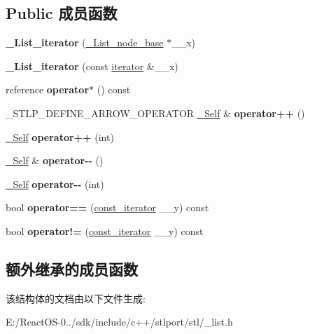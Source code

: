 \subsection*{Public 成员函数}
\begin{DoxyCompactItemize}
\item 
\mbox{\label{struct___list__iterator_af55729763691bebee5eb588d18cbed0b}} 
{\bfseries \+\_\+\+List\+\_\+iterator} (\hyperlink{struct___list__node__base}{\+\_\+\+List\+\_\+node\+\_\+base} $\ast$\+\_\+\+\_\+x)
\item 
\mbox{\label{struct___list__iterator_ab6acb69220ef88d8b08afce813d27341}} 
{\bfseries \+\_\+\+List\+\_\+iterator} (const \hyperlink{struct___list__iterator}{iterator} \&\+\_\+\+\_\+x)
\item 
\mbox{\label{struct___list__iterator_a5df300e0ea9dc281703eaabe8ec1741e}} 
reference {\bfseries operator$\ast$} () const
\item 
\mbox{\label{struct___list__iterator_a9cfd9449410548623388a8b28020253f}} 
\+\_\+\+S\+T\+L\+P\+\_\+\+D\+E\+F\+I\+N\+E\+\_\+\+A\+R\+R\+O\+W\+\_\+\+O\+P\+E\+R\+A\+T\+OR \hyperlink{struct___list__iterator}{\+\_\+\+Self} \& {\bfseries operator++} ()
\item 
\mbox{\label{struct___list__iterator_a51574ccca9f905ec314105fde336ded5}} 
\hyperlink{struct___list__iterator}{\+\_\+\+Self} {\bfseries operator++} (int)
\item 
\mbox{\label{struct___list__iterator_a89a0eac7d6d0ea505125f04705df9457}} 
\hyperlink{struct___list__iterator}{\+\_\+\+Self} \& {\bfseries operator-\/-\/} ()
\item 
\mbox{\label{struct___list__iterator_ac148cd86671003ff1165803328c3e972}} 
\hyperlink{struct___list__iterator}{\+\_\+\+Self} {\bfseries operator-\/-\/} (int)
\item 
\mbox{\label{struct___list__iterator_aa53e8ed668eb74d6dab92b59b8e226fd}} 
bool {\bfseries operator==} (\hyperlink{struct___list__iterator}{const\+\_\+iterator} \+\_\+\+\_\+y) const
\item 
\mbox{\label{struct___list__iterator_a35177a1a135d50d5d9ca8ed231d91a01}} 
bool {\bfseries operator!=} (\hyperlink{struct___list__iterator}{const\+\_\+iterator} \+\_\+\+\_\+y) const
\end{DoxyCompactItemize}
\subsection*{额外继承的成员函数}


该结构体的文档由以下文件生成\+:\begin{DoxyCompactItemize}
\item 
E\+:/\+React\+O\+S-\/0../sdk/include/c++/stlport/stl/\+\_\+list.\+h\end{DoxyCompactItemize}
